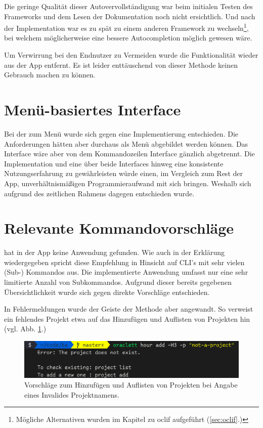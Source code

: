 \documentclass[oneside,bibliography=totocnumbered,BCOR=5mm]{scrbook}
\begin{document}
\medskip

Die geringe Qualität dieser Autovervollständigung war beim initialen Testen
des Frameworks und dem Lesen der Dokumentation noch nicht ersichtlich.
Und nach der Implementation war es zu spät zu einem anderen Framework zu
wechseln\footnote{Mögliche Alternativen wurden im Kapitel zu oclif aufgeführt
(\ref{sec:oclif}.)}, bei welchem möglicherweise eine bessere Autocompletion
möglich gewesen wäre.

\medskip

Um Verwirrung bei den Endnutzer zu Vermeiden wurde die Funktionalität wieder aus
der App entfernt. Es ist leider enttäuschend von dieser Methode keinen Gebrauch
machen zu können.

\section{Menü-basiertes Interface}
\label{sec:impl-menu}

Bei der  zum Menü wurde sich gegen eine Implementierung
entschieden. Die Anforderungen hätten aber durchaus als Menü abgebildet werden
können. Das Interface wäre aber von dem Kommandozeilen Interface gänzlich
abgetrennt. Die Implementation und eine über beide Interfaces hinweg eine
konsistente Nutzungserfahrung zu gewährleisten würde einen, im Vergleich zum
Rest der App, unverhältnismäßigen Programmieraufwand mit sich bringen. Weshalb
sich aufgrund des zeitlichen Rahmens dagegen entschieden wurde.

\section{Relevante Kommandovorschläge}

 hat in der App keine Anwendung gefunden. Wie
auch in der Erklärung wiedergegeben spricht \textcite{dutta} diese Empfehlung in
Hinsicht auf CLI's mit sehr vielen (Sub-) Kommandos aus. Die implementierte
Anwendung umfasst nur eine sehr limitierte Anzahl von Subkommandos. Aufgrund
dieser bereits gegebenen Übersichtlichkeit wurde sich gegen direkte Vorschläge
entschieden.

\medskip

In Fehlermeldungen wurde der Geiste der Methode aber angewandt. So verweist ein fehlendes Projekt etwa auf das Hinzufügen und Auflisten von Projekten hin (vgl. Abb. \ref{fig:recommendation-invalid-project}.)

\begin{figure}
  \centering
  \includegraphics[scale=0.5]{recommendation-invalid-project.png}
  \caption{Vorschläge zum Hinzufügen und Auflisten von Projekten bei Angabe eines Invalides Projektnamens.}
  \label{fig:recommendation-invalid-project}
\end{figure}
\end{document}
